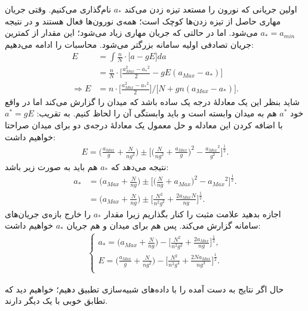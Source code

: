 اولین جریانی که نورون را مستعد تیزه زدن می‌کند $a_*$ نام‌گذاری می‌کنیم. وقتی جریان مهاری حاصل از تیزه زدن‌ها کوچک است؛ همه‌ی نورون‌ها فعال هستند و در نتیجه‌ 
$a_* = a_{min}$
می‌شود. اما در حالتی که جریان مهاری زیاد می‌شود؛ این مقدار از کمترین جریان تصادفی اولیه سامانه بزرگتر می‌شود. محاسبات را ادامه می‌دهیم:
\begin{align}
	E &=  \int \frac{n}{N} \cdot \big[ a - g E \big] da \\
	&= \frac{n}{N} \cdot \bigg[ \frac{a^2_{Max} - {a_*}^2}{2} - g E (a_{Max} - a_*) \bigg] \\
	\Rightarrow E &= n \cdot \bigg[ \frac{a^2_{Max} - {a_*}^2}{2}  \bigg] / \big[ N + g n (a_{Max} - a_*)\big].
	\label{}
\end{align}
شاید بنظر این یک معادلهٔ درجه یک ساده باشد که میدان را گزارش می‌کند اما در واقع خود $a^*$ هم به میدان وابسته است و باید وابستگی آن را لحاظ کنیم. به تقریب:
$a^{*} = gE$
با اضافه کردن این معادله و حل معمول یک معادلهٔ درجه‌ی دو برای میدان صراحتا خواهیم داشت:
\begin{align}
	E =  \bigg( \frac{a_{Max}}{g} + \frac{N}{n g^2}  \bigg) \pm \bigg[ \bigg( \frac{N}{n g^2} + \frac{a_{Max}}{g} \bigg)^2 - \frac{{a_{Max}}^2}{g^2} \bigg]^{\frac{1}{2}}.
\end{align}
نتیجه می‌دهد که $a_{*}$ هم باید به صورت زیر باشد:
\begin{align}
	a_{*} &=  \bigg( a_{Max} + \frac{N}{n g} \bigg) \pm \bigg[ \bigg( \frac{N}{n g} + a_{Max} \bigg)^2 - {a_{Max}}^2 \bigg]^{\frac{1}{2}}.\\
	&=  \bigg( a_{Max} + \frac{N}{n g} \bigg) \pm \bigg[  \frac{N^2}{n^2 g^2} + \frac{2a_{Max}N}{ng}  \bigg]^{\frac{1}{2}}.
\end{align}
اجازه بدهید علامت مثبت را کنار بگذاریم زیرا مقدار $a_{*}$ را خارج بازه‌ی جریان‌های سامانه گزارش می‌کند. پس هم برای میدان و هم جریان $a_{*}$ خواهیم داشت:
\begin{align}
	\begin{cases}
		a_{*} =  \big( a_{Max} + \frac{N}{n g} \big) - \big[  \frac{N^2}{n^2 g^2} + \frac{2a_{Max}}{ng}  \big]^{\frac{1}{2}} ,\\
		E =  \big( \frac{a_{Max}}{g} + \frac{N}{n g^2} \big) - \big[ \frac{N^2}{n^2 g^4} + \frac{2Na_{Max}}{ng^3}  \big]^{\frac{1}{2}} .\\
	\end{cases}
\end{align}

حال اگر نتایج به دست آمده را با داده‌های شبیه‌سازی تطبیق دهیم؛ خواهیم دید که تطابق خوبی با یک دیگر دارند.

